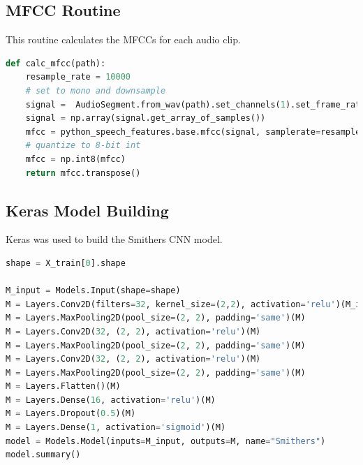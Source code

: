 \documentclass[conference]{IEEEtran}
\begin{document}
\subsection{MFCC Routine}\label{appendix:mfcc}
This routine calculates the MFCCs for each audio clip.

\begin{lstlisting}[language=Python]
def calc_mfcc(path):
    resample_rate = 10000
    # set to mono and downsample
    signal =  AudioSegment.from_wav(path).set_channels(1).set_frame_rate(resample_rate)
    signal = np.array(signal.get_array_of_samples())
    mfcc = python_speech_features.base.mfcc(signal, samplerate=resample_rate, winstep=0.025, numcep=13, winfunc=np.hanning)
    # quantize to 8-bit int
    mfcc = np.int8(mfcc)
    return mfcc.transpose()
\end{lstlisting}

\subsection{Keras Model Building}\label{appendix:model}
Keras was used to build the Smithers CNN model.

\begin{lstlisting}[language=Python]
shape = X_train[0].shape

M_input = Models.Input(shape=shape)
M = Layers.Conv2D(filters=32, kernel_size=(2,2), activation='relu')(M_input)
M = Layers.MaxPooling2D(pool_size=(2, 2), padding='same')(M)
M = Layers.Conv2D(32, (2, 2), activation='relu')(M)
M = Layers.MaxPooling2D(pool_size=(2, 2), padding='same')(M)
M = Layers.Conv2D(32, (2, 2), activation='relu')(M)
M = Layers.MaxPooling2D(pool_size=(2, 2), padding='same')(M)
M = Layers.Flatten()(M)
M = Layers.Dense(16, activation='relu')(M)
M = Layers.Dropout(0.5)(M)
M = Layers.Dense(1, activation='sigmoid')(M)
model = Models.Model(inputs=M_input, outputs=M, name="Smithers")
model.summary()   
\end{lstlisting}
\end{document}
